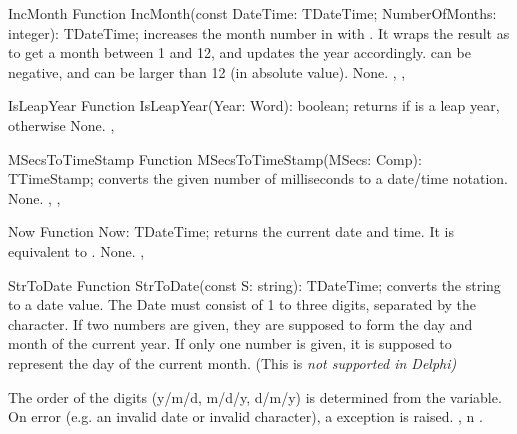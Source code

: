  
\begin{function}{IncMonth}
\Declaration
Function IncMonth(const DateTime: TDateTime; NumberOfMonths: integer): TDateTime;
\Description
{} increases the month number in  with
. It wraps the result as to get a month between 1 and
12, and updates the year accordingly.  can be negative,
and can be larger than 12 (in absolute value).
\Errors
None.
\SeeAlso
{}, , 
\end{function}


\html{}
 
\begin{function}{IsLeapYear}
\Declaration
Function IsLeapYear(Year: Word): boolean;
\Description
{} returns  if  is a leap year,
 otherwise
\Errors
None.
\SeeAlso
{}, 
\end{function}

\html{}
 
\begin{function}{MSecsToTimeStamp}
\Declaration
Function MSecsToTimeStamp(MSecs: Comp): TTimeStamp;
\Description
{} converts the given number of milliseconds to
a  date/time notation.
\Errors
None.
\SeeAlso
{}, , 
\end{function}

\html{}
 
\begin{function}{Now}
\Declaration
Function Now: TDateTime;
\Description
{} returns the current date and time. It is equivalent to 
.
\Errors
None.
\SeeAlso
{}, 
\end{function}

\html{}
 
\begin{function}{StrToDate}
\Declaration
Function StrToDate(const S: string): TDateTime;
\Description
{} converts the string  to a  date 
value. The Date must consist of 1 to three digits, separated by the 
 character. If two numbers are given, they
are supposed to form the day and month of the current year. If only 
one number is given, it is supposed to represent the day of the 
current month. (This is \em{not} supported in Delphi)

The order of the digits (y/m/d, m/d/y, d/m/y) is determined from the 
 variable.
\Errors
On error (e.g. an invalid date or invalid character), 
a  exception is raised.
\SeeAlso
{}, n .
\end{function}

